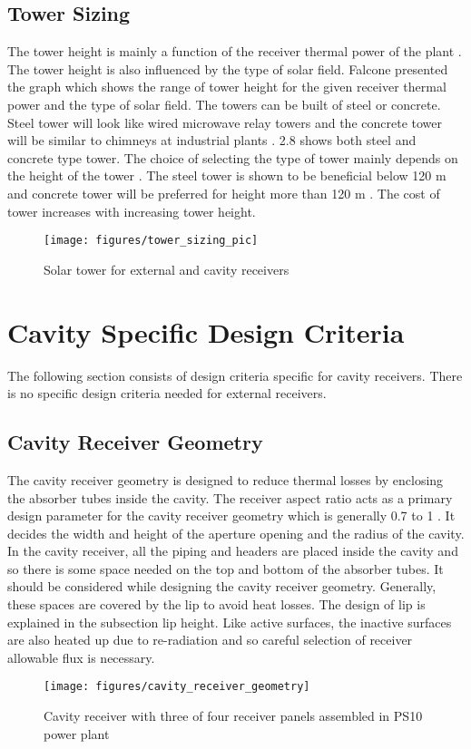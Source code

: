 \subsection{Tower Sizing}
The tower height is mainly a function of the receiver thermal power of the plant \cite{Falcone.1986}. The tower height is also influenced by the type of solar field. Falcone \cite{Falcone.1986} presented the graph which shows the range of tower height for the given receiver thermal power and the type of solar field. The towers can be built of steel or concrete. Steel tower will look like wired microwave relay towers and the concrete tower will be similar to chimneys at industrial plants \cite{Falcone.1986}. \figurename{ 2.8} shows both steel and concrete type tower. The choice of selecting the type of tower mainly depends on the height of the tower \cite{Falcone.1986}. The steel tower is shown to be beneficial below 120 m  and concrete tower will be preferred for height more than 120 m \cite{Falcone.1986}. The cost of tower increases with increasing tower height. 
\begin{figure}[h]
	\texttt{[image: figures/tower\_sizing\_pic]}
	\centering
	\caption{Solar tower for external and cavity receivers \cite{Feierabend.2010}}
\end{figure}
\section{Cavity Specific Design Criteria}
The following section consists of design criteria specific for cavity receivers. There is no specific design criteria needed for external receivers. 
\subsection{Cavity Receiver Geometry}
The cavity receiver geometry is designed to reduce thermal losses by enclosing the absorber tubes inside the cavity. The receiver aspect ratio acts as a primary design parameter for the cavity receiver geometry which is generally 0.7 to 1 \cite{Falcone.1986}. It decides the width and height of the aperture opening and the radius of the cavity. In the cavity receiver, all the piping and headers are placed inside the cavity and so there is some space needed on the top and bottom of the absorber tubes. It should be considered while designing the cavity receiver geometry. Generally, these spaces are covered by the lip to avoid heat losses. The design of lip is explained in the subsection lip height. Like active surfaces, the inactive surfaces are also heated up due to re-radiation and so careful selection of receiver allowable flux is necessary. 
\begin{figure}[h]
	\texttt{[image: figures/cavity\_receiver\_geometry]}
	\centering
	\caption{Cavity receiver with three of four receiver panels assembled in PS10 power plant \cite{Feierabend.2010}}
\end{figure}
